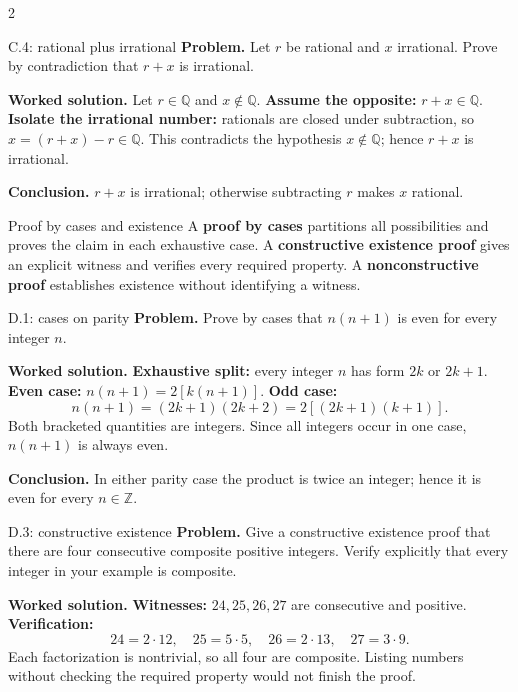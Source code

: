 \documentclass[10pt]{article}
\newcommand{\term}[1]{\textbf{\color{CoreNavy}#1}}
\begin{document}
\begin{multicols}{2}
\begin{workedbox}{C.4: rational plus irrational}
\textbf{Problem.} Let $r$ be rational and $x$ irrational. Prove by contradiction that $r+x$ is irrational.

\textbf{Worked solution.} Let $r\in\mathbb Q$ and $x\notin\mathbb Q$. \textbf{Assume the opposite:}
$r+x\in\mathbb Q$. \textbf{Isolate the irrational number:} rationals are closed
under subtraction, so $x=(r+x)-r\in\mathbb Q$. This contradicts the hypothesis
$x\notin\mathbb Q$; hence $r+x$ is irrational.

\textbf{Conclusion.} $r+x$ is irrational; otherwise subtracting $r$ makes $x$ rational.
\end{workedbox}


\begin{definitionbox}{Proof by cases and existence}
A \term{proof by cases} partitions all possibilities and proves the claim in
each exhaustive case. A \term{constructive existence proof} gives an explicit
witness and verifies every required property. A \term{nonconstructive proof}
establishes existence without identifying a witness.
\end{definitionbox}

\begin{workedbox}{D.1: cases on parity}
\textbf{Problem.} Prove by cases that $n(n+1)$ is even for every integer $n$.

\textbf{Worked solution.} \textbf{Exhaustive split:} every integer $n$ has form $2k$ or $2k+1$.
\textbf{Even case:} $n(n+1)=2[k(n+1)]$. \textbf{Odd case:}
\[
n(n+1)=(2k+1)(2k+2)=2[(2k+1)(k+1)].
\]
Both bracketed quantities are integers. Since all integers occur in one case,
$n(n+1)$ is always even.

\textbf{Conclusion.} In either parity case the product is twice an integer; hence it is even for every $n\in\mathbb Z$.
\end{workedbox}

\begin{workedbox}{D.3: constructive existence}
\textbf{Problem.} Give a constructive existence proof that there are four consecutive composite positive integers. Verify explicitly that every integer in your example is composite.

\textbf{Worked solution.} \textbf{Witnesses:} $24,25,26,27$ are consecutive and positive.
\textbf{Verification:}
\[
24=2\cdot12,\quad25=5\cdot5,\quad26=2\cdot13,\quad27=3\cdot9.
\]
Each factorization is nontrivial, so all four are composite. Listing numbers
without checking the required property would not finish the proof.


\end{workedbox}
\end{multicols}
\end{document}
